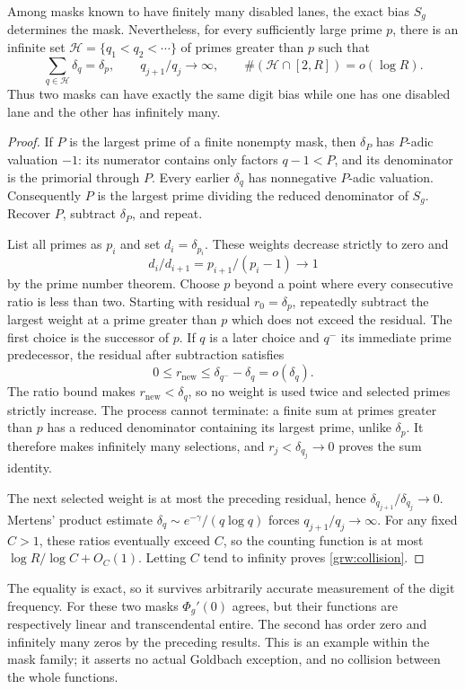 \begin{proposition}\label{grw:bias-collision}
Among masks known to have finitely many disabled lanes, the exact bias $S_g$ determines the mask.
Nevertheless, for every sufficiently large prime $p$, there is an
infinite set $\mathcal H=\{q_1<q_2<\cdots\}$ of primes greater than
$p$ such that
\begin{equation}
 \sum_{q\in\mathcal H}\delta_q=\delta_p,\qquad
 q_{j+1}/q_j\longrightarrow\infty,
 \qquad \#(\mathcal H\cap[2,R])=o(\log R).
 \label{grw:collision}
\end{equation}
Thus two masks can have exactly the same digit bias while one has
one disabled lane and the other has infinitely many.
\end{proposition}
\begin{proof}
If $P$ is the largest prime of a finite nonempty mask, then
$\delta_P$ has $P$-adic valuation $-1$: its numerator contains only
factors $q-1<P$, and its denominator is the primorial through $P$.
Every earlier $\delta_q$ has nonnegative $P$-adic valuation.
Consequently $P$ is the largest prime dividing the reduced
denominator of $S_g$.  Recover $P$, subtract $\delta_P$, and repeat.

List all primes as $p_i$ and set $d_i=\delta_{p_i}$.  These weights
decrease strictly to zero and
\[
 d_i/d_{i+1}=p_{i+1}/(p_i-1)\longrightarrow1
\]
by the prime number theorem.  Choose $p$ beyond a point where every
consecutive ratio is less than two.  Starting with residual
$r_0=\delta_p$, repeatedly subtract the largest weight at a prime
greater than $p$ which does not exceed the residual.
The first choice is the successor of $p$.  If $q$ is a later
choice and $q^-$ its immediate prime predecessor, the residual
after subtraction satisfies
\[
 0\le r_{\mathrm{new}}
 \le\delta_{q^-}-\delta_q=o(\delta_q).
\]
The ratio bound makes $r_{\mathrm{new}}<\delta_q$, so no weight is
used twice and selected primes strictly increase.  The process
cannot terminate: a finite sum at primes greater than $p$ has a
reduced denominator containing its largest prime, unlike
$\delta_p$.  It therefore makes infinitely many selections, and
$r_j<\delta_{q_j}\to0$ proves the sum identity.

The next selected weight is at most the preceding residual, hence
$\delta_{q_{j+1}}/\delta_{q_j}\to0$.  Mertens' product estimate
$\delta_q\sim e^{-\gamma}/(q\log q)$ forces
$q_{j+1}/q_j\to\infty$.  For any fixed $C>1$, these ratios
eventually exceed $C$, so the counting function is at most
$\log R/\log C+O_C(1)$.  Letting $C$ tend to infinity proves
\eqref{grw:collision}.
\end{proof}

The equality is exact, so it survives arbitrarily accurate measurement
of the digit frequency.  For these two masks $\Phi_g'(0)$ agrees,
but their functions are
respectively linear and transcendental entire.  The second has
order zero and infinitely many zeros by the preceding results.
This is an example within the mask family; it asserts no actual
Goldbach exception, and no collision between the whole functions.

